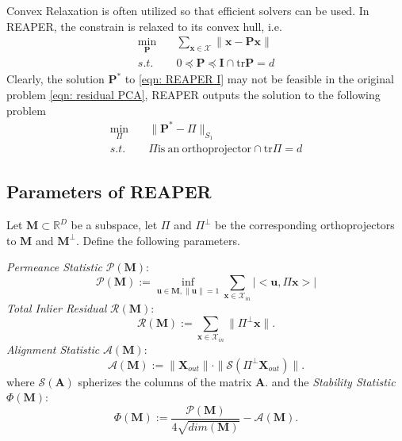 \documentclass[
10pt, %
a4paper, %
oneside, %
headinclude,footinclude, %
BCOR5mm, %
]{scrartcl}
\newcommand{\AB}{\mathbf{A}}
\newcommand{\IB}{\mathbf{I}}
\newcommand{\MB}{\mathbf{M}}
\newcommand{\PB}{\mathbf{P}}
\newcommand{\XB}{\mathbf{X}}
\newcommand{\uB}{\mathbf{u}}
\newcommand{\xB}{\mathbf{x}}
\newcommand{\AM}{\mathcal{A}}
\newcommand{\PM}{\mathcal{P}}
\newcommand{\XM}{\mathcal{X}}
\newcommand{\SM}{\mathcal{S}}
\newcommand{\RM}{\mathcal{R}}
\newcommand{\RBB}{\mathbb{R}}
\begin{document}
Convex Relaxation is often utilized so that efficient solvers can be used. In REAPER, the constrain is relaxed to its convex hull, i.e.
\begin{equation}
	\begin{aligned}
		\min_{\PB} & \quad \sum_{\xB \in \XM} \|\xB - \PB\xB\| \\
		s.t. & \quad 0 \preccurlyeq \PB \preccurlyeq \IB  \cap \mathrm{tr} \PB = d
	\end{aligned}
	\label{eqn: REAPER I}
\end{equation}
Clearly, the solution $\PB^*$ to \ref{eqn: REAPER I} may not be feasible in the original problem \ref{eqn: residual PCA}, REAPER outputs the solution to the following problem 
\begin{equation}
	\begin{aligned}
		\min_{\Pi} & \quad \|\PB^* - \Pi\|_{S_1} \\
		s.t. & \quad \Pi \mathrm{is~an~orthoprojector} \cap \mathrm{tr} \Pi = d
	\end{aligned}
\end{equation}

\subsection{Parameters of REAPER}
Let $\MB \subset \RBB^D$ be a subspace, let $\Pi$ and $\Pi^\bot$ be the corresponding orthoprojectors to $\MB$ and $\MB^\bot$. Define the following parameters.

\emph{Permeance Statistic} $\PM(\MB)$:
\begin{equation}
	\PM(\MB) := \inf_{\uB \in \MB, \|\uB\|=1} \sum_{\xB\in\XM_{in}} |<\uB, \Pi \xB>|
\end{equation}
\emph{Total Inlier Residual} $\RM(\MB)$:
\begin{equation}
	\RM(\MB) := \sum_{\xB \in \XM_{in}} \|\Pi^\bot \xB\|.
\end{equation}
\emph{Alignment Statistic} $\AM(\MB)$:
\begin{equation}
	\AM(\MB) := \|\XB_{out}\|\cdot \|\SM(\Pi^\bot \XB_{out})\|.
\end{equation}
where $\SM(\AB)$ spherizes the columns of the matrix $\AB$.
and the \emph{Stability Statistic} $\Phi(\MB)$:
\begin{equation}
	\Phi(\MB) := \frac{\PM(\MB)}{4\sqrt{dim(\MB)}} - \AM(\MB).
\end{equation}


\end{document}
